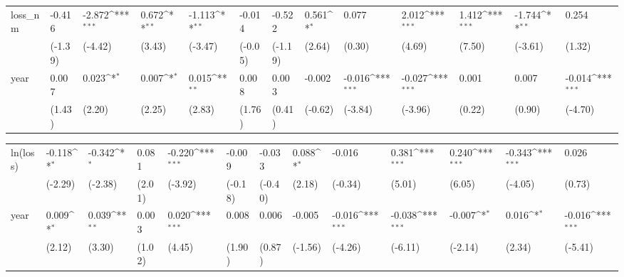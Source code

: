 \def\sym#1{\ifmmode^{#1}\else\(^{#1}\)\fi}
\begin{tabular}{p{1.5cm} p{1.7cm} p{1.7cm} p{1.7cm}  p{1.7cm} p{1.7cm} p{1.7cm} p{1.7cm} p{1.7cm}  p{1.7cm} p{1.7cm} p{1.7cm} p{1.7cm} }
\hline
loss\_nm         &   -0.416         &   -2.872\sym{***}&    0.672\sym{**} &   -1.113\sym{**} &   -0.014         &   -0.522         &    0.561\sym{*}  &    0.077         &    2.012\sym{***}&    1.412\sym{***}&   -1.744\sym{**} &    0.254         \\
                &  (-1.39)         &  (-4.42)         &   (3.43)         &  (-3.47)         &  (-0.05)         &  (-1.19)         &   (2.64)         &   (0.30)         &   (4.69)         &   (7.50)         &  (-3.61)         &   (1.32)         \\
year            &    0.007         &    0.023\sym{*}  &    0.007\sym{*}  &    0.015\sym{**} &    0.008         &    0.003         &   -0.002         &   -0.016\sym{***}&   -0.027\sym{***}&    0.001         &    0.007         &   -0.014\sym{***}\\
                &   (1.43)         &   (2.20)         &   (2.25)         &   (2.83)         &   (1.76)         &   (0.41)         &  (-0.62)         &  (-3.84)         &  (-3.96)         &   (0.22)         &   (0.90)         &  (-4.70)         \\
\end{tabular}
\def\sym#1{\ifmmode^{#1}\else\(^{#1}\)\fi}
\begin{tabular}{p{1.5cm} p{1.7cm} p{1.7cm} p{1.7cm}  p{1.7cm} p{1.7cm} p{1.7cm} p{1.7cm} p{1.7cm}  p{1.7cm} p{1.7cm} p{1.7cm} p{1.7cm} }
\hline
ln(loss)        &   -0.118\sym{*}  &   -0.342\sym{*}  &    0.081         &   -0.220\sym{***}&   -0.009         &   -0.033         &    0.088\sym{*}  &   -0.016         &    0.381\sym{***}&    0.240\sym{***}&   -0.343\sym{***}&    0.026         \\
                &  (-2.29)         &  (-2.38)         &   (2.01)         &  (-3.92)         &  (-0.18)         &  (-0.40)         &   (2.18)         &  (-0.34)         &   (5.01)         &   (6.05)         &  (-4.05)         &   (0.73)         \\
year            &    0.009\sym{*}  &    0.039\sym{**} &    0.003         &    0.020\sym{***}&    0.008         &    0.006         &   -0.005         &   -0.016\sym{***}&   -0.038\sym{***}&   -0.007\sym{*}  &    0.016\sym{*}  &   -0.016\sym{***}\\
                &   (2.12)         &   (3.30)         &   (1.02)         &   (4.45)         &   (1.90)         &   (0.87)         &  (-1.56)         &  (-4.26)         &  (-6.11)         &  (-2.14)         &   (2.34)         &  (-5.41)         \\
\end{tabular}
